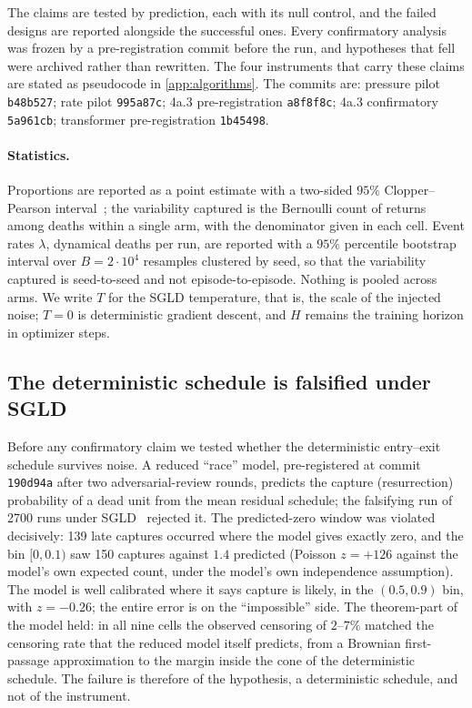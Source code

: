\documentclass[11pt]{article}
\theoremstyle{definition}
\theoremstyle{remark}
\begin{document}
The claims are tested by prediction, each with its null control, and the failed
designs are reported alongside the successful ones. Every confirmatory analysis
was frozen by a pre-registration commit before the run, and hypotheses that fell
were archived rather than rewritten. The four instruments that carry these claims are
stated as pseudocode in \cref{app:algorithms}. The commits are: pressure pilot
\texttt{b48b527}; rate pilot \texttt{995a87c}; 4a.3 pre-registration
\texttt{a8f8f8c}; 4a.3 confirmatory \texttt{5a961cb}; transformer
pre-registration \texttt{1b45498}.

\paragraph{Statistics.}
Proportions are reported as a point estimate with a two-sided $95\%$
Clopper--Pearson interval~\cite{CP34}; the variability captured is the Bernoulli
count of returns among deaths within a single arm, with the denominator given in
each cell. Event rates $\lambda$, dynamical deaths per run, are reported with a
$95\%$ percentile bootstrap interval over $B=2\cdot10^{4}$ resamples clustered by
seed, so that the variability captured is seed-to-seed and not
episode-to-episode. Nothing is pooled across arms. We write $T$ for the SGLD
temperature, that is, the scale of the injected noise; $T=0$ is deterministic
gradient descent, and $H$ remains the training horizon in optimizer steps.

\subsection{The deterministic schedule is falsified under SGLD}\label{sec:falsification}

Before any confirmatory claim we tested whether the deterministic entry--exit
schedule survives noise. A reduced ``race'' model, pre-registered at commit
\texttt{190d94a} after two adversarial-review rounds, predicts the capture
(resurrection) probability of a dead unit from the mean residual schedule; the
falsifying run of 2700 runs under SGLD~\cite{WT11} rejected it. The
predicted-zero window was violated decisively: 139 late captures occurred where
the model gives exactly zero, and the bin $[0,0.1)$ saw 150 captures against
$1.4$ predicted (Poisson $z=+126$ against the model's own expected count, under
the model's own independence assumption). The model is well calibrated where it
says capture is likely, in the $(0.5,0.9)$ bin, with $z=-0.26$; the entire error
is on the ``impossible'' side. The theorem-part of the model held: in all nine
cells the observed censoring of $2$--$7\%$ matched the censoring rate that the
reduced model itself predicts, from a Brownian first-passage approximation to the
margin inside the cone of the deterministic schedule. The failure is therefore of
the hypothesis, a deterministic schedule, and not of the instrument.
\end{document}
